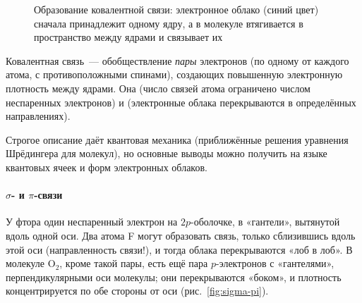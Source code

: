 \begin{figure}[ht]
\centering
{}
\caption{Образование ковалентной связи: электронное облако (синий цвет)
сначала принадлежит одному ядру, а в молекуле втягивается в пространство
между ядрами и связывает их}
\label{fig:H2}
\end{figure}

\begin{glavnoe}
Ковалентная связь~— обобществление \emph{пары} электронов (по одному от
каждого атома, с противоположными спинами), создающих повышенную
электронную плотность между ядрами. Она  (число связей
атома ограничено числом неспаренных электронов) и 
(электронные облака перекрываются в определённых направлениях).
\end{glavnoe}

Строгое описание даёт квантовая механика (приближённые решения уравнения
Шрёдингера для молекул), но основные выводы можно получить на языке
квантовых ячеек и форм электронных облаков.

\paragraph{$\sigma$- и $\pi$-связи}
У фтора один неспаренный электрон на $2p$-оболочке, в «гантели»,
вытянутой вдоль одной оси. Два атома F могут образовать связь, только
сблизившись вдоль этой оси (направленность связи!), и тогда облака
перекрываются «лоб в лоб». В молекуле O$_2$, кроме такой пары, есть ещё
пара $p$-электронов с «гантелями», перпендикулярными оси молекулы; они
перекрываются «боком», и плотность концентрируется по обе стороны от оси
(рис.~\ref{fig:sigma-pi}).

